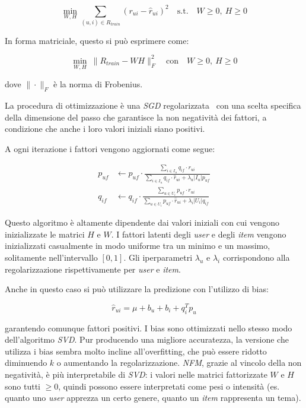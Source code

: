 \[
\min_{W, H} \sum_{(u,i) \in R_{train}} \left( r_{ui} - \hat{r}_{ui} \right)^2 \quad \text{s.t.} \quad W \geq 0,\ H \geq 0
\]

In forma matriciale, questo si può esprimere come:

\[
\min_{W, H} \ \| R_{train} - WH \|_F^2 \quad \text{con} \quad W \geq 0,\ H \geq 0
\]

dove $\| \cdot \|_F$ è la norma di Frobenius.

La procedura di ottimizzazione è una \textit{SGD} regolarizzata~\cite{NMF} con una scelta specifica della dimensione del passo che garantisce la non negatività dei fattori, a condizione che anche i loro valori iniziali siano positivi.

A ogni iterazione i fattori vengono aggiornati come segue:

\[
\begin{aligned}
p_{uf} &\leftarrow p_{uf} \cdot \frac{\sum\limits_{i \in I_u} q_{if} \cdot r_{ui}}{\sum\limits_{i \in I_u} q_{if} \cdot \hat{r}_{ui} + \lambda_u |I_u| p_{uf}} \\
q_{if} &\leftarrow q_{if} \cdot \frac{\sum\limits_{u \in U_i} p_{uf} \cdot r_{ui}}{\sum\limits_{u \in U_i} p_{uf} \cdot \hat{r}_{ui} + \lambda_i |U_i| q_{if}}
\end{aligned}
\]

Questo algoritmo è altamente dipendente dai valori iniziali con cui vengono inizializzate le matrici $H$ e $W$. I fattori latenti degli \textit{user} e degli \textit{item} vengono inizializzati casualmente in modo uniforme tra un minimo e un massimo, solitamente nell'intervallo $[0, 1]$. Gli iperparametri $\lambda_u$ e $\lambda_i$ corrispondono alla regolarizzazione rispettivamente per \textit{user} e \textit{item}.

Anche in questo caso si può utilizzare la predizione con l'utilizzo di bias:

\[
\hat{r}_{ui} = \mu + b_u + b_i + q_i^T p_u
\]

garantendo comunque fattori positivi. I bias sono ottimizzati nello stesso modo dell'algoritmo \textit{SVD}. Pur producendo una migliore accuratezza, la versione che utilizza i bias sembra molto incline all'overfitting, che può essere ridotto diminuendo $k$ o aumentando la regolarizzazione. \textit{NFM}, grazie al vincolo della non negatività, è più interpretabile di \textit{SVD}: i valori nelle matrici fattorizzate $W$ e $H$ sono tutti $\geq 0$, quindi possono essere interpretati come pesi o intensità (es. quanto uno \textit{user} apprezza un certo genere, quanto un \textit{item} rappresenta un tema).

